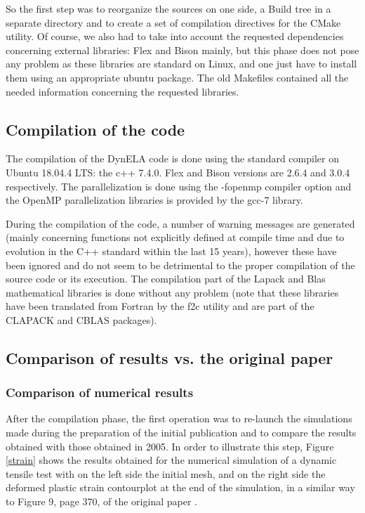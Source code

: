 So the first step was to reorganize the sources on one side, a Build tree in a separate directory and to create a set of compilation directives for the CMake utility. Of course, we also had to take into account the requested dependencies concerning external libraries: Flex and Bison \cite{Levine:2009} mainly, but this phase does not pose any problem as these libraries are standard on Linux, and one just have to install them using an appropriate ubuntu package. The old Makefiles contained all the needed information concerning the requested libraries.

\subsection{Compilation of the code}

The compilation of the DynELA code is done using the standard compiler on Ubuntu 18.04.4 LTS: the c++ 7.4.0. Flex and Bison versions are 2.6.4 and 3.0.4 respectively. The parallelization is done using the -fopenmp compiler option and the OpenMP parallelization libraries is provided by the gcc-7 library.

During the compilation of the code, a number of warning messages are generated (mainly concerning functions not explicitly defined at compile time and due to evolution in the C++ standard within the last 15 years), however these have been ignored and do not seem to be detrimental to the proper compilation of the source code or its execution. The compilation part of the Lapack and Blas mathematical libraries is done without any problem (note that these libraries have been translated from Fortran by the f2c utility and are part of the CLAPACK and CBLAS packages).

\subsection{Comparison of results vs. the original paper}

\subsubsection{Comparison of numerical results}\label{Ptensile}

After the compilation phase, the first operation was to re-launch the simulations made during the preparation of the initial publication and to compare the results obtained with those obtained in 2005. In order to illustrate this step, Figure \ref{strain} shows the results obtained for the numerical simulation of a dynamic tensile test with on the left side the initial mesh, and on the right side the deformed plastic strain contourplot at the end of the simulation, in a similar way to Figure 9, page 370, of the original paper \cite{Pantale:2005}.

